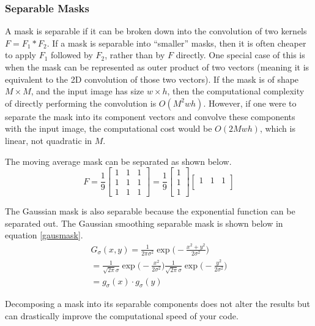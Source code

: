 \documentclass[twoside]{article}
\begin{document}
\subsubsection{Separable Masks}
A mask is separable if it can be broken down into the convolution of two kernels $F = F_1 * F_2$. If a mask is separable into ``smaller'' masks, then it is often cheaper to apply $F_1$ followed by $F_2$, rather than by $F$ directly. One special case of this is when the mask can be represented as outer product of two vectors (meaning it is equivalent to the 2D convolution of those two vectors). If the mask is of shape $M\times M$, and the input image has size $w\times h$, then the computational complexity of directly performing the convolution is $O(M^2wh)$. However, if one were to separate the mask into its component vectors and convolve these components with the input image, the computational cost would be $O(2Mwh)$, which is linear, not quadratic in $M$. 

The moving average mask can be separated as shown below.
\[
F = \frac{1}{9}
\begin{bmatrix}
1 & 1 & 1\\
1 & 1 & 1\\
1 & 1 & 1
\end{bmatrix} = \frac{1}{9}
\begin{bmatrix}
1 \\
1 \\
1
\end{bmatrix}
\begin{bmatrix}
1 & 1 & 1\\
\end{bmatrix}
\]

The Gaussian mask is also separable because the exponential function can be separated out. The Gaussian smoothing separable mask is shown below in equation \ref{gausmask}.
\begin{equation}
\label{gausmask}
  \begin{aligned}
    G_\sigma(x,y) = \frac{1}{2\pi\sigma^2} \exp \bigg(-\frac{x^2 + y^2}{2\sigma^2} \bigg)\\
    = \frac{1}{\sqrt{2\pi}\sigma}\exp \bigg(-\frac{x^2}{2\sigma^2}\bigg)\frac{1}{\sqrt{2\pi}\sigma} \exp \bigg(-\frac{y^2}{2\sigma^2}\bigg) \\
    = g_\sigma(x) \cdot g_\sigma(y)
  \end{aligned}
\end{equation}

Decomposing a mask into its separable components does not alter the results but can drastically improve the computational speed of your code.
\end{document}
